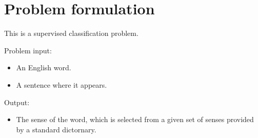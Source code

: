 \section{Problem formulation}

This is a supervised classification problem.

Problem input: 
\begin{itemize}
  \item An English word. 
  \item A sentence where it appears.
\end{itemize}
Output:
\begin{itemize}
  \item The sense of the word, which is selected from a given set of senses provided by
a standard dictornary.
\end{itemize}
